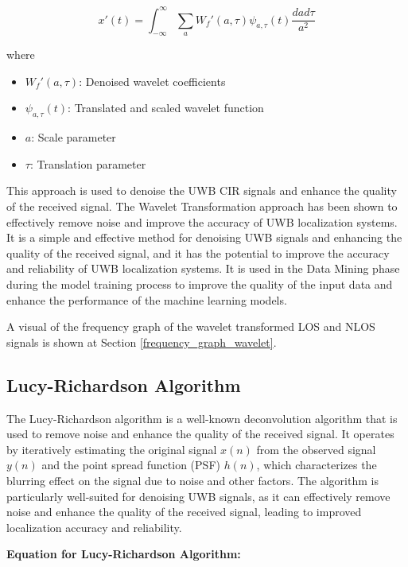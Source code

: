 \documentclass[
	article, %
	11pt, %
]{CSUniSchoolLabReport}
\begin{document}
\begin{equation}
x'(t) = \int_{-\infty}^{\infty} \sum_{a} W_f'(a, \tau) \psi_{a, \tau}(t) \frac{da d\tau}{a^2}
\end{equation}

where 

\begin{itemize}
  \item $W_f'(a, \tau)$: Denoised wavelet coefficients
  \item $\psi_{a, \tau}(t)$: Translated and scaled wavelet function
  \item $a$: Scale parameter
  \item $\tau$: Translation parameter
\end{itemize}

This approach is used to denoise the UWB CIR signals and enhance the quality of the received signal. The Wavelet Transformation approach has been shown to effectively remove noise and improve the accuracy of UWB localization systems. It is a simple and effective method for denoising UWB signals and enhancing the quality of the received signal, and it has the potential to improve the accuracy and reliability of UWB localization systems. It is used in the Data Mining phase during the model training process to improve the quality of the input data and enhance the performance of the machine learning models.

A visual of the frequency graph of the wavelet transformed LOS and NLOS signals is shown at Section \ref{frequency_graph_wavelet}.

\subsection{Lucy-Richardson Algorithm}\label{lucy_richardson_algorithm}

The Lucy-Richardson algorithm is a well-known deconvolution algorithm that is used to remove noise and enhance the quality of the received signal. It operates by iteratively estimating the original signal $x(n)$ from the observed signal $y(n)$ and the point spread function (PSF) $h(n)$, which characterizes the blurring effect on the signal due to noise and other factors. The algorithm is particularly well-suited for denoising UWB signals, as it can effectively remove noise and enhance the quality of the received signal, leading to improved localization accuracy and reliability.

\textbf{Equation for Lucy-Richardson Algorithm:}
\end{document}
